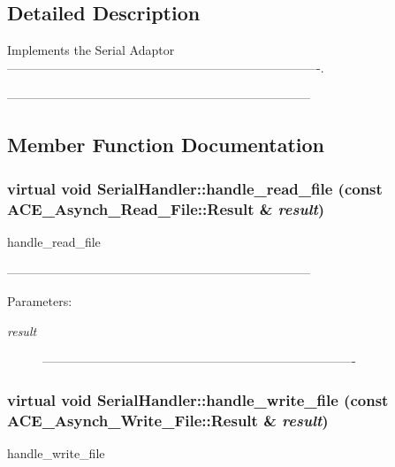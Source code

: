 \subsection{Detailed Description}
Implements the Serial Adaptor ----------------------------------------------------------------------------. 

-------------------------------------------------------------------------- 



\subsection{Member Function Documentation}
\subsubsection{\setlength{\rightskip}{0pt plus 5cm}virtual void Serial\-Handler::handle\_\-read\_\-file (const ACE\_\-Asynch\_\-Read\_\-File::Result \& {\em result})\hspace{0.3cm}{\tt  [protected, virtual]}}\label{classSerialHandler_b0}


handle\_\-read\_\-file 

-------------------------------------------------------------------------- 

\begin{Desc}
\item[Parameters:]
\begin{description}
\item[{\em result}]---------------------------------------------------------------------------- \end{description}
\end{Desc}
\subsubsection{\setlength{\rightskip}{0pt plus 5cm}virtual void Serial\-Handler::handle\_\-write\_\-file (const ACE\_\-Asynch\_\-Write\_\-File::Result \& {\em result})\hspace{0.3cm}{\tt  [protected, virtual]}}\label{classSerialHandler_b1}


handle\_\-write\_\-file 

